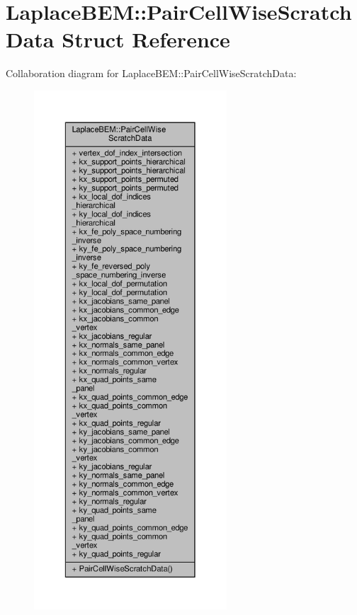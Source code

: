 \hypertarget{structLaplaceBEM_1_1PairCellWiseScratchData}{}\section{Laplace\+B\+EM\+:\+:Pair\+Cell\+Wise\+Scratch\+Data Struct Reference}
\label{structLaplaceBEM_1_1PairCellWiseScratchData}


Collaboration diagram for Laplace\+B\+EM\+:\+:Pair\+Cell\+Wise\+Scratch\+Data\+:\nopagebreak
\begin{figure}[H]
\begin{center}
\leavevmode
\includegraphics[height=550pt]{structLaplaceBEM_1_1PairCellWiseScratchData__coll__graph}
\end{center}
\end{figure}
